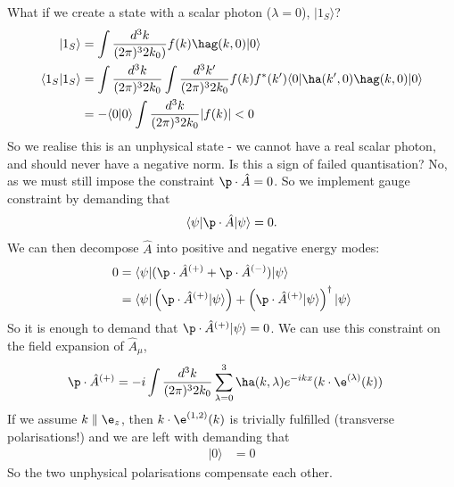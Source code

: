\documentclass[a4paper, 11pt, normalem]{report}
\begin{document}
What if we create a state with a scalar photon ($\lambda=0$), $|1_S\rangle$?
\begin{align}
    |1_S\rangle &= \int \frac{d^3k}{(2\pi)^32k_0)} f(k)\hag(k,0)|0\rangle \\
    \langle1_S|1_S\rangle &= \int \frac{d^3k}{(2\pi)^32k_0} \int \frac{d^3k'}{(2\pi)^32k_0} f(k)f^*(k')\langle0|\ha(k',0)\hag(k,0)|0\rangle \\
                          &= -\langle0|0\rangle \int\frac{d^3k}{(2\pi)^32k_0} |f(k)| < 0
\end{align}
So we realise this is an unphysical state - we cannot have a real scalar photon, and should never have a negative norm.  
Is this a sign of failed quantisation?
No, as we must still impose the constraint $\p\cdot\hat{A}=0$.
So we implement gauge constraint by demanding that
\begin{align}
    \langle\psi|\p\cdot\hat{A}|\psi\rangle = 0.
\end{align} 
We can then decompose $\hat{A}$ into positive and negative energy modes:
\begin{align}
    0 &= \langle\psi|(\p\cdot\hat{A}^{(+)}+\p\cdot\hat{A}^{(-)})|\psi\rangle \\
      &= \langle\psi|\left(\p\cdot\hat{A}^{(+)}|\psi\rangle\right) + \left(\p\cdot\hat{A}^{(+)}|\psi\rangle\right)^\dagger |\psi\rangle
\end{align}
So it is enough to demand that $\p\cdot\hat{A}^{(+)}|\psi\rangle = 0$.
We can use this constraint on the field expansion of $\hat{A}_\mu$,
\begin{align}
    \p\cdot\hat{A}^{(+)} &= -i\int\frac{d^3k}{(2\pi)^32k_0} \sum_{\lambda=0}^3 \ha(k,\lambda)e^{-ikx}(k\cdot\e^{(\lambda)}(k))
\end{align}
If we assume $k\parallel\e_z$, then $k\cdot\e^{(1,2)}(k)$ is trivially fulfilled (transverse polarisations!) and we are left with demanding that
\begin{align}
    [\ha(k,3) - \ha(k,0)]|0\rangle &= 0
\end{align}
So the two unphysical polarisations compensate each other.
\end{document}
